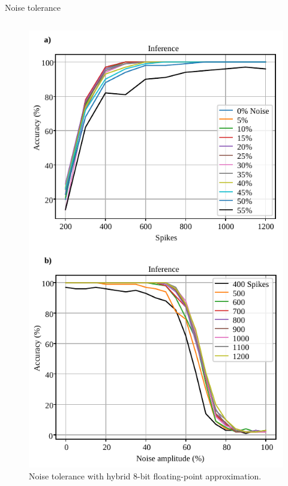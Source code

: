 \begin{frame}{Noise tolerance}
\begin{columns}
		\begin{column}{0.33\textwidth}
			\centering
			\begin{figure}
			\includegraphics[width=0.75\linewidth]{../chapters/sbs_accelerator/figures/accuracy_vs_noise_pu_cfp(4-bit-exponent_1-bit-mantissa).pdf} %
			\caption{\scriptsize Noise tolerance with hybrid 8-bit floating-point approximation.}
			\end{figure}
			\pause
		\end{column}
		

\end{columns}
\end{frame}
